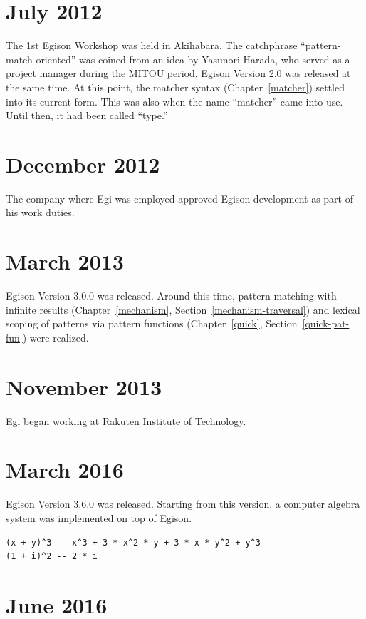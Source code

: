 \section*{July 2012}

The 1st Egison Workshop was held in Akihabara.
The catchphrase ``pattern-match-oriented'' was coined from an idea by Yasunori Harada, who served as a project manager during the MITOU period.
Egison Version 2.0 was released at the same time.
At this point, the matcher syntax (Chapter~\ref{matcher}) settled into its current form.
This was also when the name ``matcher'' came into use.
Until then, it had been called ``type.''

\section*{December 2012}

The company where Egi was employed approved Egison development as part of his work duties.

\section*{March 2013}

Egison Version 3.0.0 was released.
Around this time, pattern matching with infinite results (Chapter~\ref{mechanism}, Section~\ref{mechanism-traversal}) and lexical scoping of patterns via pattern functions (Chapter~\ref{quick}, Section~\ref{quick-pat-fun}) were realized.

\section*{November 2013}

Egi began working at Rakuten Institute of Technology.

\section*{March 2016}

Egison Version 3.6.0 was released.
Starting from this version, a computer algebra system was implemented on top of Egison.
\begin{lstlisting}[language=egison,numbers=none]
(x + y)^3 -- x^3 + 3 * x^2 * y + 3 * x * y^2 + y^3
(1 + i)^2 -- 2 * i
\end{lstlisting}

\section*{June 2016}

